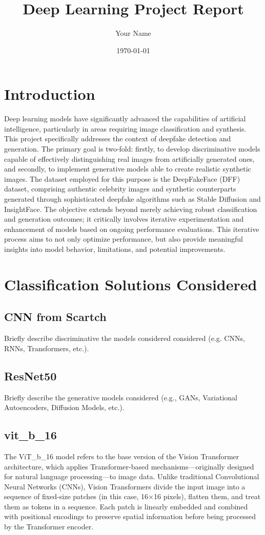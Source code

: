 \documentclass[a4paper,11pt]{article}
\title{Deep Learning Project Report}
\author{Your Name}
\date{\today}
\begin{document}
\maketitle

\section{Introduction}
Deep learning models have significantly advanced the capabilities of artificial intelligence, particularly in areas requiring image classification and synthesis. This project specifically addresses the context of deepfake detection and generation. The primary goal is two-fold: firstly, to develop discriminative models capable of effectively distinguishing real images from artificially generated ones, and secondly, to implement generative models able to create realistic synthetic images. The dataset employed for this purpose is the DeepFakeFace (DFF) dataset, comprising authentic celebrity images and synthetic counterparts generated through sophisticated deepfake algorithms such as Stable Diffusion and InsightFace. The objective extends beyond merely achieving robust classification and generation outcomes; it critically involves iterative experimentation and enhancement of models based on ongoing performance evaluations. This iterative process aims to not only optimize performance, but also provide meaningful insights into model behavior, limitations, and potential improvements.



\section{Classification Solutions Considered}
\subsection{CNN from Scartch}
Briefly describe discriminative the models considered considered (e.g. CNNs, RNNs, Transformers, etc.).

\subsection{ResNet50}
Briefly describe the generative models considered (e.g., GANs, Variational Autoencoders, Diffusion Models, etc.).

\subsection{vit\_b\_16}
The ViT\_b\_16 model refers to the base version of the Vision Transformer architecture, which applies Transformer-based mechanisms—originally designed for natural language processing—to image data. Unlike traditional Convolutional Neural Networks (CNNs), Vision Transformers divide the input image into a sequence of fixed-size patches (in this case, 16×16 pixels), flatten them, and treat them as tokens in a sequence. Each patch is linearly embedded and combined with positional encodings to preserve spatial information before being processed by the Transformer encoder.
\end{document}
